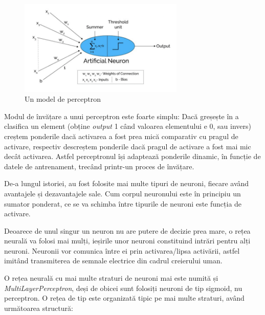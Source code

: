 \begin{figure}[!htbp]
    \begin{center}
        \includegraphics[width=0.7\textwidth]{images/perceptron.png}
        \caption{Un model de perceptron\cite{adi-from-perceptron}}
    \end{center}
\end{figure}
\label{perceptron}

Modul de învățare a unui perceptron este foarte simplu: Dacă greșește în a clasifica un element (obține \textit{output} 1 când valoarea elementului e 0, sau invers) creștem ponderile dacă activarea a fost prea mică comparativ cu pragul de activare, respectiv descreștem ponderile dacă pragul de activare a fost mai mic decât activarea.
Astfel perceptronul își adaptează ponderile dinamic, în funcție de datele de antrenament, trecând printr-un proces de învățare.

De-a lungul istoriei, au fost folosite mai multe tipuri de neuroni, fiecare având avantajele și dezavantajele sale. Cum corpul neuronului este în principiu un sumator ponderat, ce se va schimba între tipurile de neuroni este funcția de activare.

Deoarece de unul singur un neuron nu are putere de decizie prea mare, o rețea neurală va folosi mai mulți,  ieșirile unor neuroni constituind intrări pentru alți neuroni. Neuronii vor comunica între ei prin activarea/lipsa activării, astfel imitând transmiterea de semnale electrice din cadrul creierului uman. 

O rețea neurală cu mai multe straturi de neuroni mai este numită și \textit{MultiLayerPerceptron}, deși de obicei sunt folosiți neuroni de tip sigmoid, nu perceptron. O rețea de tip este organizată tipic pe mai multe straturi, având următoarea structură:

